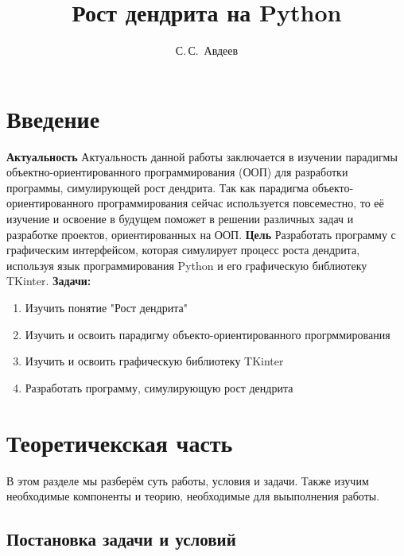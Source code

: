 \documentclass[14pt, oneside]{altsu-report}
\title{Рост дендрита на Python}
\author{С.\,С.~Авдеев}
\institute{Институт цифровых технологий, электроники и физики}
\date{\the\year}
\begin{document}
\maketitle

\setcounter{page}{2}
\makeabstract
\tableofcontents

\chapter*{Введение}

\textbf{Актуальность}
\newline
Актуальность данной работы заключается в изучении парадигмы объектно-ориентированного программирования (ООП) для разработки программы, симулирующей рост дендрита. Так как парадигма объекто-ориентированного программирования сейчас используется повсеместно, то её изучение и освоение в будущем поможет в решении различных задач и разработке проектов, ориентированных на ООП.
\newline
\textbf{Цель}
\newline
Разработать программу с графическим интерфейсом, которая симулирует процесс роста дендрита, используя язык программирования Python и его графическую библиотеку TKinter.
\newline
\textbf{Задачи:}
\begin{enumerate}
\item Изучить понятие "Рост дендрита"
\item Изучить и освоить парадигму объекто-ориентированного прогрммирования
\item Изучить и освоить графическую библиотеку TKinter 
\item Разработать программу, симулирующую рост дендрита
\end{enumerate}





\chapter{Теоретичекская часть}
В этом разделе мы разберём суть работы, условия и задачи. Также изучим необходимые компоненты и теорию, необходимые для выыполнения работы.
\section{Постановка задачи и условий}
\end{document}
